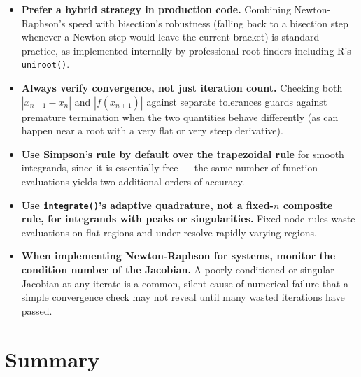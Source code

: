 \documentclass[
]{article}
\providecommand{\tightlist}{%
  \setlength{\itemsep}{0pt}\setlength{\parskip}{0pt}}
\begin{document}
\begin{itemize}
\tightlist
\item
  \textbf{Prefer a hybrid strategy in production code.} Combining
  Newton-Raphson's speed with bisection's robustness (falling back to a
  bisection step whenever a Newton step would leave the current bracket)
  is standard practice, as implemented internally by professional
  root-finders including R's \texttt{uniroot()}.
\item
  \textbf{Always verify convergence, not just iteration count.} Checking
  both \(|x_{n+1}-x_n|\) and \(|f(x_{n+1})|\) against separate
  tolerances guards against premature termination when the two
  quantities behave differently (as can happen near a root with a very
  flat or very steep derivative).
\item
  \textbf{Use Simpson's rule by default over the trapezoidal rule} for
  smooth integrands, since it is essentially free --- the same number of
  function evaluations yields two additional orders of accuracy.
\item
  \textbf{Use \texttt{integrate()}'s adaptive quadrature, not a
  fixed-\(n\) composite rule, for integrands with peaks or
  singularities.} Fixed-node rules waste evaluations on flat regions and
  under-resolve rapidly varying regions.
\item
  \textbf{When implementing Newton-Raphson for systems, monitor the
  condition number of the Jacobian.} A poorly conditioned or singular
  Jacobian at any iterate is a common, silent cause of numerical failure
  that a simple convergence check may not reveal until many wasted
  iterations have passed.
\end{itemize}

\section{Summary}\label{summary}
\end{document}
